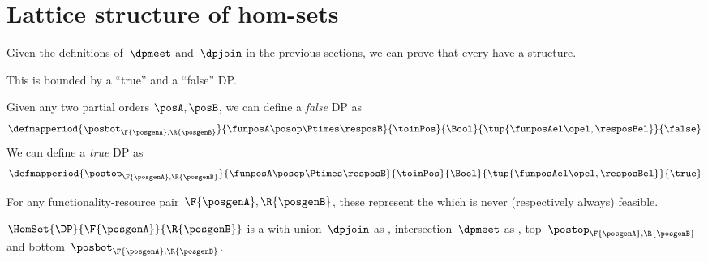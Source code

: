 \section{Lattice structure of \DP hom-sets}

Given the definitions of~$\dpmeet$ and~$\dpjoin$ in the previous sections, we can prove that every \DP {} have a  structure.

This  is bounded by a ``true'' and a ``false'' DP.

\begin{definition}\label{def:false-true-DP}
    Given any two partial orders $\posA,\posB$, we can define a \emph{false}
    DP as
    \begin{equation*}
        \defmapperiod{\posbot_{\F{\posgenA},\R{\posgenB}}}{\funposA \posop \Ptimes \resposB}{\toinPos}{\Bool}
        {\tup{\funposAel\opel,\resposBel}}{\false}
    \end{equation*}
    We can define a \emph{true} DP as
    \begin{equation*}
        \defmapperiod{\postop_{\F{\posgenA},\R{\posgenB}}}{\funposA \posop \Ptimes \resposB}{\toinPos}{\Bool}
        {\tup{\funposAel\opel,\resposBel}}{\true}
    \end{equation*}
\end{definition}

For any functionality-resource pair~$\F{\posgenA},\R{\posgenB}$, these represent the  which is never (respectively always) feasible.

\begin{lemma}
    \label{lem:dpboundedlattice}
    $\HomSet{\DP}{\F{\posgenA}}{\R{\posgenB}}$ is a  with union~$\dpjoin$ as , intersection~$\dpmeet$ as , top~$\postop_{\F{\posgenA},\R{\posgenB}}$ and bottom~$\posbot_{\F{\posgenA},\R{\posgenB}}$.
\end{lemma}

